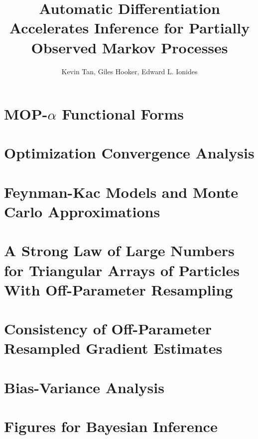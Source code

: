 \documentclass[9pt,twoside,lineno]{pnas-new-si}
\begin{document}
\title{Automatic Differentiation Accelerates Inference for Partially Observed Markov Processes}
\author{Kevin Tan, Giles Hooker, Edward L. Ionides}






\maketitle

\SItext




\section{MOP-$\alpha$ Functional Forms}


\label{appendix:functional}



\section{Optimization Convergence Analysis}
\label{appendix:convergence}


\section{Feynman-Kac Models and Monte Carlo Approximations}
\label{appendix:feynman}


\section{A Strong Law of Large Numbers for Triangular Arrays of Particles With Off-Parameter Resampling}
\label{appendix:targeting}



\section{Consistency of Off-Parameter Resampled Gradient Estimates}
\label{appendix:consistency}


\section{Bias-Variance Analysis}
\label{appendix:biasvar}


\section{Figures for Bayesian Inference}
\label{appendix:bayes}




\end{document}
